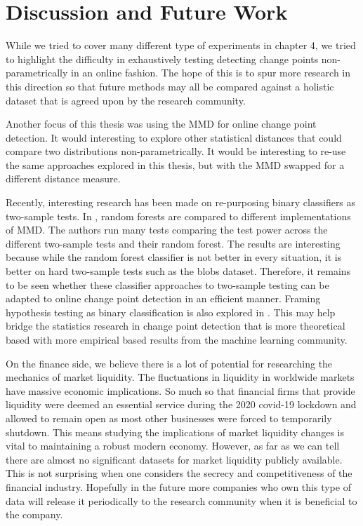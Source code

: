 \section{Discussion and Future Work}

While we tried to cover many different type of experiments in chapter 4, we tried to highlight the difficulty in exhaustively testing detecting change points non-parametrically in an online fashion. The hope of this is to spur more research in this direction so that future methods may all be compared against a holistic dataset that is agreed upon by the research community.

Another focus of this thesis was using the MMD for online change point detection. It would interesting to explore other statistical distances that could compare two distributions non-parametrically. It would be interesting to re-use the same approaches explored in this thesis, but with the MMD swapped for a different distance measure. %

Recently, interesting research has been made on re-purposing binary classifiers as two-sample tests. In \cite{hediger2019use}, random forests are compared to different implementations of MMD. The authors run many tests comparing the test power across the different two-sample tests and their random forest. The results are interesting because while the random forest classifier is not better in every situation, it is better on hard two-sample tests such as the blobs dataset. Therefore, it remains to be seen whether these classifier approaches to two-sample testing can be adapted to online change point detection in an efficient manner. Framing hypothesis testing as binary classification is also explored in \cite{lopez2016revisiting}. This may help bridge the statistics research in change point detection that is more theoretical based with more empirical based results from the machine learning community. 

On the finance side, we believe there is a lot of potential for researching the mechanics of market liquidity. The fluctuations in liquidity in worldwide markets have massive economic implications. So much so that financial firms that provide liquidity were deemed an essential service during the 2020 covid-19 lockdown and allowed to remain open as most other businesses were forced to temporarily shutdown. This means studying the implications of market liquidity changes is vital to maintaining a robust modern economy. However, as far as we can tell there are almost no significant datasets for market liquidity publicly available. This is not surprising when one considers the secrecy and competitiveness of the financial industry. Hopefully in the future more companies who own this type of data will release it periodically to the research community when it is beneficial to the company. %